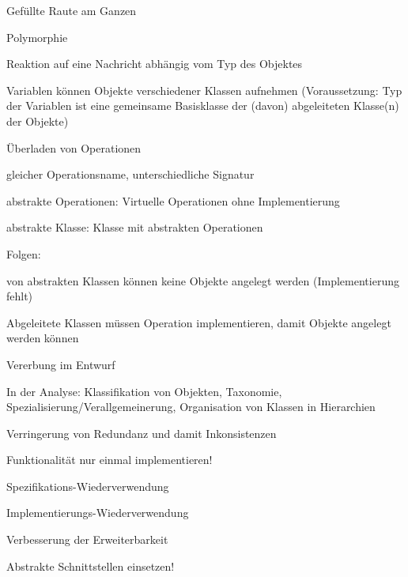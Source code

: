 \documentclass[a4paper]{article}
\begin{document}
\begin{multicols}{3}
\begin{itemize*}
\begin{itemize*}
\begin{itemize*}
                    \item Gefüllte Raute am Ganzen
                  \end{itemize*}
            \item Polymorphie
                  \begin{itemize*}
                    \item Reaktion auf eine Nachricht abhängig vom Typ des Objektes
                    \item Variablen können Objekte verschiedener Klassen aufnehmen (Voraussetzung: Typ der Variablen ist eine gemeinsame Basisklasse der (davon) abgeleiteten Klasse(n) der Objekte)
                    \item Überladen von Operationen
                    \item gleicher Operationsname, unterschiedliche Signatur
                    \item abstrakte Operationen: Virtuelle Operationen ohne Implementierung
                    \item abstrakte Klasse: Klasse mit abstrakten Operationen
                    \item Folgen:
                    \item von abstrakten Klassen können keine Objekte angelegt werden (Implementierung fehlt)
                    \item Abgeleitete Klassen müssen Operation implementieren, damit Objekte angelegt werden können
                  \end{itemize*}
          \end{itemize*}
  \end{itemize*}

  Vererbung im Entwurf
  \begin{itemize*}
    \item In der Analyse: Klassifikation von Objekten, Taxonomie, Spezialisierung/Verallgemeinerung, Organisation von Klassen in Hierarchien
    \item Verringerung von Redundanz und damit Inkonsistenzen
          \begin{itemize*}
            \item Funktionalität nur einmal implementieren!
            \item Spezifikations-Wiederverwendung
            \item Implementierungs-Wiederverwendung
          \end{itemize*}
    \item Verbesserung der Erweiterbarkeit
          \begin{itemize*}
            \item Abstrakte Schnittstellen einsetzen!
          \end{itemize*}
  \end{itemize*}


\end{multicols}
\end{document}
